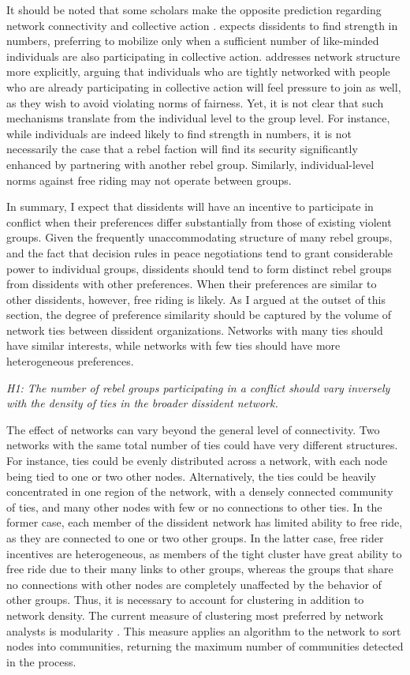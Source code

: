 It should be noted that some scholars make the opposite prediction regarding network connectivity and collective action \citep[e.g.][]{Marwell1988}. \citet{Kuran1991} expects dissidents to find strength in numbers, preferring to mobilize only when a sufficient number of like-minded individuals are also participating in collective action. \citet{Gould1993} addresses network structure more explicitly, arguing that individuals who are tightly networked with people who are already participating in collective action will feel pressure to join as well, as they wish to avoid violating norms of fairness. Yet, it is not clear that such mechanisms translate from the individual level to the group level. For instance, while individuals are indeed likely to find strength in numbers, it is not necessarily the case that a rebel faction will find its security significantly enhanced by partnering with another rebel group. Similarly, individual-level norms against free riding \citep{Gould1993} may not operate between groups.

In summary, I expect that dissidents will have an incentive to participate in conflict when their preferences differ substantially from those of existing violent groups. Given the frequently unaccommodating structure of many rebel groups, and the fact that decision rules in peace negotiations tend to grant considerable power to individual groups, dissidents should tend to form distinct rebel groups from dissidents with other preferences. When their preferences are similar to other dissidents, however, free riding is likely. As I argued at the outset of this section, the degree of preference similarity should be captured by the volume of network ties between dissident organizations. Networks with many ties should have similar interests, while networks with few ties should have more heterogeneous preferences.

\noindent \textit{H1: The number of rebel groups participating in a conflict should vary inversely with the density of ties in the broader dissident network.}

The effect of networks can vary beyond the general level of connectivity. Two networks with the same total number of ties could have very different structures. For instance, ties could be evenly distributed across a network, with each node being tied to one or two other nodes. Alternatively, the ties could be heavily concentrated in one region of the network, with a densely connected community of ties, and many other nodes with few or no connections to other ties. In the former case, each member of the dissident network has limited ability to free ride, as they are connected to one or two other groups. In the latter case, free rider incentives are heterogeneous, as members of the tight cluster have great ability to free ride due to their many links to other groups, whereas the groups that share no connections with other nodes are completely unaffected by the behavior of other groups. Thus, it is necessary to account for clustering in addition to network density. The current measure of clustering most preferred by network analysts is modularity \citep{Newman2004a}. This measure applies an algorithm to the network to sort nodes into communities, returning the maximum number of communities detected in the process. 

